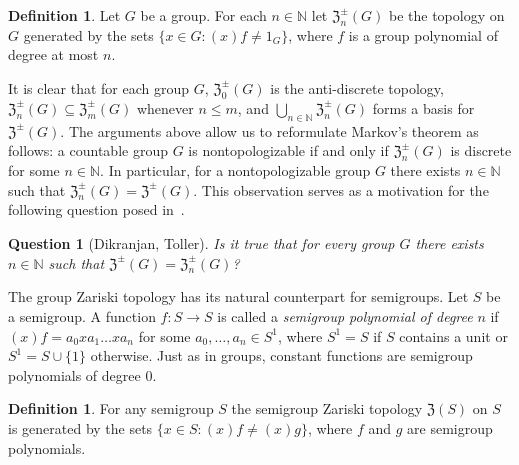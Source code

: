 \documentclass[11pt]{amsart}
\newtheorem{question}[theorem]{Question}
\theoremstyle{definition}
\newtheorem{definition}[theorem]{Definition}
\newcommand{\N}{\mathbb N}
\begin{document}
\begin{definition}
Let $G$ be a group. For each $n\in\N$ let $\mathfrak{Z}_n^{\pm}(G)$ be the topology on $G$ 
 generated by the sets $\{x\in G: (x)f\neq 1_G\}$, where $f$ is a group polynomial of degree at most $n$.     
\end{definition}

It is clear that for each group $G$, $\mathfrak{Z}_0^{\pm}(G)$ is the anti-discrete topology, $\mathfrak{Z}_n^{\pm}(G)\subseteq \mathfrak{Z}_m^{\pm}(G)$ whenever $n\leq m$, and $\bigcup_{n\in\N}\mathfrak{Z}_n^{\pm}(G)$ forms a basis for $\mathfrak{Z}^{\pm}(G)$.
The arguments above allow us to reformulate Markov's theorem as follows: a countable group $G$ is nontopologizable if and only if $\mathfrak{Z}_n^{\pm}(G)$ is discrete for some $n\in\N$. In particular, for a nontopologizable group $G$ there exists $n\in\N$ such that $\mathfrak{Z}_n^{\pm}(G)=\mathfrak{Z}^{\pm}(G)$. This observation serves as a motivation for the following question posed in~\cite[Question 2.4]{DikranjanToller}. 

\begin{question}[Dikranjan, Toller]\label{Dikr}
    Is it true that for every group \(G\) there exists $n\in\N$ such that $\mathfrak{Z}^{\pm}(G)=\mathfrak{Z}^{\pm}_{n}(G)$? 
\end{question}


The group Zariski topology has its natural counterpart for semigroups. 
Let $S$ be a semigroup. A function $f: S\rightarrow S$ is called a {\em semigroup polynomial of degree} $n$ if $(x)f=a_0xa_1\dots xa_n$ for some $a_0,\ldots,a_n\in S^1$, where $S^1=S$ if $S$ contains a unit or $S^{1}=S\cup\{1\}$ otherwise. 
Just as in groups, constant functions are semigroup polynomials of degree $0$. %

\begin{definition}
 For any semigroup $S$ the semigroup Zariski topology $\mathfrak{Z}(S)$ on $S$ is generated by the sets $\{x\in S: (x)f\neq (x)g\}$, where $f$ and $g$ are semigroup polynomials.   
\end{definition}

\end{document}
